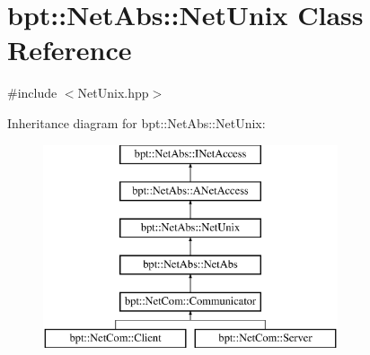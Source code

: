 \hypertarget{classbpt_1_1_net_abs_1_1_net_unix}{\section{bpt\-:\-:Net\-Abs\-:\-:Net\-Unix Class Reference}
\label{classbpt_1_1_net_abs_1_1_net_unix}
}


{\ttfamily \#include $<$Net\-Unix.\-hpp$>$}

Inheritance diagram for bpt\-:\-:Net\-Abs\-:\-:Net\-Unix\-:\begin{figure}[H]
\begin{center}
\leavevmode
\includegraphics[height=6.000000cm]{classbpt_1_1_net_abs_1_1_net_unix}
\end{center}
\end{figure}
